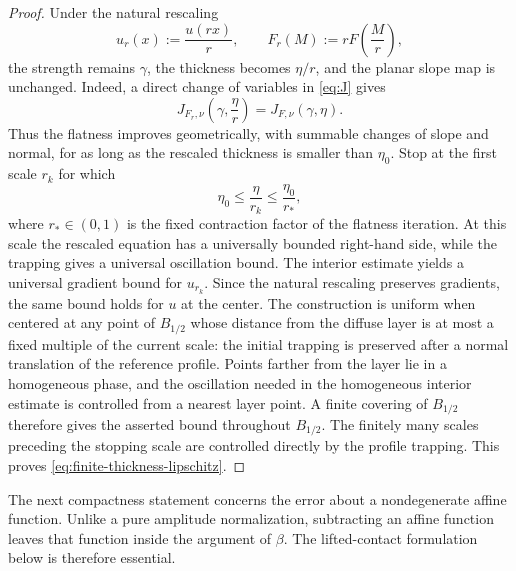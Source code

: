 \documentclass[11pt,letterpaper]{amsart}
\numberwithin{equation}{section}
\theoremstyle{definition}
\theoremstyle{remark}
\begin{document}
\begin{proof}
Under the natural rescaling
$$
u_r(x):=\frac{u(rx)}r,
\qquad
F_r(M):=rF\left(\frac Mr\right),
$$
the strength remains $\gamma$, the thickness becomes $\eta/r$, and the
planar slope map is unchanged.  Indeed, a direct change of variables in
\eqref{eq:J} gives
\begin{equation}\label{eq:J-natural-scaling}
J_{F_r,\nu}\left(\gamma,\frac\eta r\right)
=
J_{F,\nu}(\gamma,\eta).
\end{equation}
Thus the flatness improves geometrically, with summable changes of slope and
normal, for as long as the rescaled thickness is smaller than $\eta_0$.
Stop at the first scale $r_k$ for which
$$
\eta_0
\leq
\frac{\eta}{r_k}
\leq
\frac{\eta_0}{r_*},
$$
where $r_*\in(0,1)$ is the fixed contraction factor of the flatness
iteration.  At this scale the rescaled equation has a universally bounded
right-hand side, while the trapping gives a universal oscillation bound.
The interior estimate yields a universal gradient bound for $u_{r_k}$.
Since the natural rescaling preserves gradients, the same bound holds for
$u$ at the center.  The construction is uniform when centered at any point
of $B_{1/2}$ whose distance from the diffuse layer is at most a fixed
multiple of the current scale: the initial trapping is preserved after a
normal translation of the reference profile.  Points farther from the
layer lie in a homogeneous phase, and the oscillation needed in the
homogeneous interior estimate is controlled from a nearest layer point.
A finite covering of $B_{1/2}$ therefore gives the asserted bound throughout
$B_{1/2}$.  The finitely many scales preceding the stopping scale are
controlled directly by the profile trapping.  This proves
\eqref{eq:finite-thickness-lipschitz}.
\end{proof}

The next compactness statement concerns the error about a nondegenerate
affine function. Unlike a pure amplitude normalization, subtracting an
affine function leaves that function inside the argument of $\beta$. The
lifted-contact formulation below is therefore essential.
\end{document}
